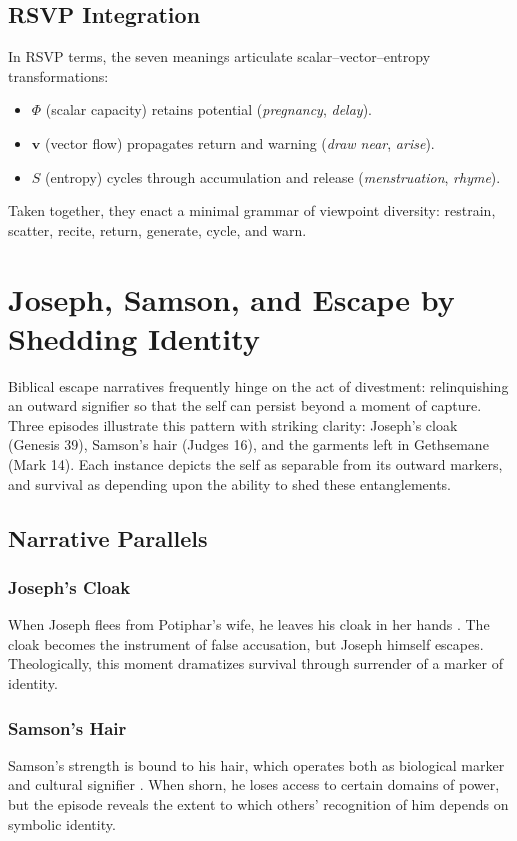 \documentclass[a4paper,11pt,openany]{book}
\begin{document}
\section{RSVP Integration}
In RSVP terms, the seven meanings articulate scalar–vector–entropy transformations:
\begin{itemize}
  \item $\Phi$ (scalar capacity) retains potential (\textit{pregnancy}, \textit{delay}).
  \item $\mathbf{v}$ (vector flow) propagates return and warning (\textit{draw near}, \textit{arise}).
  \item $S$ (entropy) cycles through accumulation and release (\textit{menstruation}, \textit{rhyme}).
\end{itemize}
Taken together, they enact a minimal grammar of viewpoint diversity: restrain, scatter, recite, return, generate, cycle, and warn.


\chapter{Joseph, Samson, and Escape by Shedding Identity}

Biblical escape narratives frequently hinge on the act of divestment: relinquishing an outward signifier so that the self can persist beyond a moment of capture. Three episodes illustrate this pattern with striking clarity: Joseph’s cloak (Genesis 39), Samson’s hair (Judges 16), and the garments left in Gethsemane (Mark 14). Each instance depicts the self as separable from its outward markers, and survival as depending upon the ability to shed these entanglements.

\section{Narrative Parallels}
\subsection*{Joseph’s Cloak}
When Joseph flees from Potiphar’s wife, he leaves his cloak in her hands \citep{bibleGenesis}. The cloak becomes the instrument of false accusation, but Joseph himself escapes. Theologically, this moment dramatizes survival through surrender of a marker of identity.

\subsection*{Samson’s Hair}
Samson’s strength is bound to his hair, which operates both as biological marker and cultural signifier \citep{bibleJudges}. When shorn, he loses access to certain domains of power, but the episode reveals the extent to which others’ recognition of him depends on symbolic identity.
\end{document}
